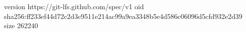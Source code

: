 version https://git-lfs.github.com/spec/v1
oid sha256:ff233ef44d72c2d3c9511e214ac99a9ea3348b5e4d586c06096d5cfd932e2d39
size 262240
